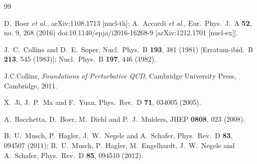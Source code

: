 \documentclass[aps,prd,preprint,tightenlines,superscriptaddress,nofootinbib]{revtex4}
\begin{document}
\begin{thebibliography}{99}

  D.~Boer %
  {\it et al.},
  arXiv:1108.1713 [nucl-th];
  A.~Accardi {\it et al.},
  Eur.\ Phys.\ J.\ A {\bf 52}, no. 9, 268 (2016)
  doi:10.1140/epja/i2016-16268-9
  [arXiv:1212.1701 [nucl-ex]].

J.~C.~Collins and D.~E.~Soper,
Nucl.\ Phys.\ B {\bf 193}, 381 (1981) [Erratum-ibid.\ B {\bf 213},
545 (1983)];
Nucl.\ Phys.\ B {\bf 197}, 446 (1982).

  
J.C.Collins, {\it Foundations of Perturbative QCD}, Cambridge University Press, Cambridge, 2011.

  X.~Ji, J.~P.~Ma and F.~Yuan,
  Phys.\ Rev.\ D {\bf 71}, 034005 (2005).


 A.~Bacchetta, D.~Boer, M.~Diehl and P.~J.~Mulders,
  JHEP {\bf 0808}, 023 (2008).

  B.~U.~Musch, P.~Hagler, J.~W.~Negele and A.~Schafer,
  Phys.\ Rev.\ D {\bf 83}, 094507 (2011);
  B.~U.~Musch, P.~Hagler, M.~Engelhardt, J.~W.~Negele and A.~Schafer,
  Phys.\ Rev.\ D {\bf 85}, 094510 (2012).


\end{thebibliography}
\end{document}
